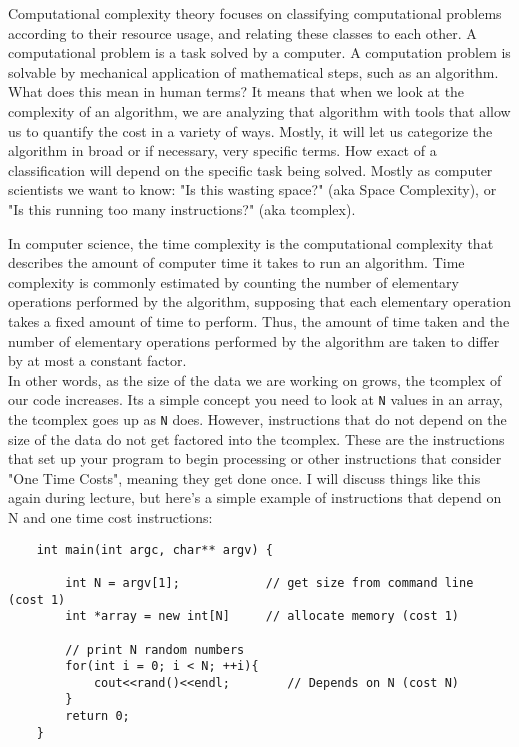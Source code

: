 \newpage
{}

Computational complexity theory focuses on classifying computational problems according to their resource usage, and relating these classes to each other. A computational problem is a task solved by a computer. A computation problem is solvable by mechanical application of mathematical steps, such as an algorithm.\\

What does this mean in human terms? It means that when we look at the complexity of an algorithm, we are analyzing that algorithm with tools that allow us to quantify the cost in a variety of ways. Mostly, it will let us categorize the algorithm in broad or if necessary, very specific terms. How exact of a classification will depend on the specific task being solved. Mostly as computer scientists we want to know: "Is this wasting space?" (aka Space Complexity), or "Is this running too many instructions?" (aka \gls{tcomplex}).  


In computer science, the time complexity is the computational complexity that describes the amount of computer time it takes to run an algorithm. Time complexity is commonly estimated by counting the number of elementary operations performed by the algorithm, supposing that each elementary operation takes a fixed amount of time to perform. Thus, the amount of time taken and the number of elementary operations performed by the algorithm are taken to differ by at most a constant factor.\\

In other words, as the size of the data we are working on grows, the \gls{tcomplex} of our code increases. Its a simple concept you need to look at \texttt{N} values in an array, the \gls{tcomplex} goes up as \texttt{N} does. However, instructions that do not depend on the size of the data do not get factored into the \gls{tcomplex}.
These are the instructions that set up your program to begin processing or other instructions that consider "One Time Costs", meaning they get done once. I will discuss things like this again during lecture, but here's a simple example of instructions that depend on N and one time cost instructions:

\begin{verbatim}
	int main(int argc, char** argv) {
		
		int N = argv[1];            // get size from command line (cost 1)
		int *array = new int[N]     // allocate memory (cost 1)
		    
		// print N random numbers
		for(int i = 0; i < N; ++i){ 
			cout<<rand()<<endl;        // Depends on N (cost N)
		}
		return 0;
	}
\end{verbatim}

